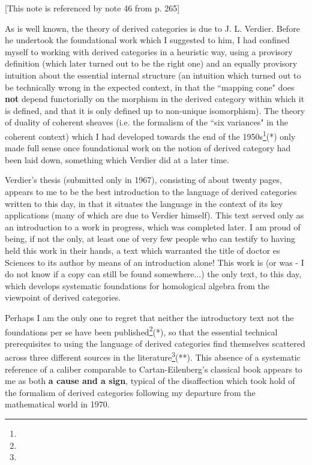 \label{note:48} [This note is referenced by note 46 from p. 265]

As is well known, the theory of derived categories is due to J. L. Verdier. Before he undertook the foundational work which I suggested to him, I had confined myself to working with derived categories in a heuristic way, using a provisory definition (which later turned out to be the right one) and an equally provisory intuition about the essential internal structure (an intuition which turned out to be technically wrong in the expected context, in that the ``mapping cone" does \textbf{not} depend functorially on the morphism in the derived category within which it is defined, and that it is only defined up to non-unique isomorphism). The theory of duality of coherent sheaves (i.e. the formalism of the ``six variances" in the coherent context) which I had developed towards the end of the 1950s\footnote{}(*) only made full sense once foundational work on the notion of derived category had been laid down, something which Verdier did at a later time. 

Verdier's thesis (submitted only in 1967), consisting of about twenty pages, appears to me to be the best introduction to the language of derived categories written to this day, in that it situates the language in the context of its key applications (many of which are due to Verdier himself). This text served only as an introduction to a work in progress, which was completed later. I am proud of being, if not the only, at least one of very few people who can testify to having held this work in their hands, a text which warranted the title of doctor es Sciences to its author by means of an introduction alone! This work is (or was - I do not know if a copy can still be found somewhere...) the only text, to this day, which develops systematic foundations for homological algebra from the viewpoint of derived categories.

Perhaps I am the only one to regret that neither the introductory text not the foundations per se have been published\footnote{}(*), so that the essential technical prerequisites to using the language of derived categories find themselves scattered across three different sources in the literature\footnote{}(**). This absence of a systematic reference of a caliber comparable to Cartan-Eilenberg's classical book appears to me as both \textbf{a cause and a sign}, typical of the disaffection which took hold of the formalism of derived categories following my departure from the mathematical world in 1970.

